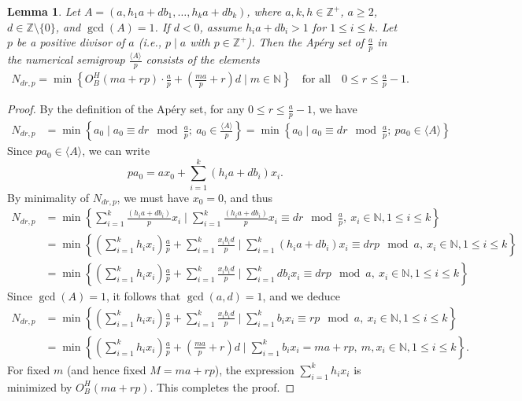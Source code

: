 \documentclass[reqno, 12pt]{article}
\newtheorem{lem}[thm]{Lemma}
\theoremstyle{mydefinition}
\theoremstyle{myremark}
\numberwithin{algorithm}{section}
\begin{document}
\begin{lem}\label{NDR-Quotient}
Let $A=(a, h_1a+db_1, \ldots, h_ka+db_k)$, where $a, k, h\in\mathbb{Z}^{+}$, $a\geq 2$, $d\in \mathbb{Z}\setminus \{0\}$, and $\gcd(A)=1$. If $d<0$, assume $h_ia+db_i>1$ for $1\leq i\leq k$.
Let $p$ be a positive divisor of $a$ (i.e., $p\mid a$ with $p\in \mathbb{Z}^{+}$). Then the Ap\'ery set of $\frac{a}{p}$ in the numerical semigroup $\frac{\langle A\rangle}{p}$ consists of the elements
\begin{align*}
N_{dr,p}=\min \left\{O_{B}^{H}(ma+rp) \cdot \frac{a}{p}+\left(\frac{ma}{p}+r\right)d \mid m\in \mathbb{N}\right\}\quad \text{for all}\quad 0\leq r\leq \frac{a}{p}-1.
\end{align*}
\end{lem}
\begin{proof}
By the definition of the Ap\'ery set, for any $0\leq r\leq \frac{a}{p}-1$, we have
\begin{align*}
N_{dr,p}&=\min\left\{ a_0\mid a_0\equiv dr\mod \frac{a}{p};\ a_0\in \frac{\langle A\rangle}{p}\right\}
=\min\left\{ a_0\mid a_0\equiv dr \mod \frac{a}{p};\ pa_0\in \langle A\rangle\right\}
\end{align*}
Since $p a_0 \in \langle A\rangle$, we can write
$$pa_0=a x_0+\sum_{i=1}^k(h_ia+db_i)x_i.$$
By minimality of $N_{dr,p}$, we must have $x_0 = 0$, and thus
\begin{align*}
N_{dr,p}&=\min\left\{\sum_{i=1}^k\frac{(h_ia+db_i)}{p}x_i\mid \sum_{i=1}^k\frac{(h_ia+db_i)}{p}x_i\equiv dr\mod \frac{a}{p}, \ x_i\in\mathbb{N}, 1\leq i\leq k \right\}
\\&=\min\left\{\left(\sum_{i=1}^k h_ix_i\right)\frac{a}{p}+\sum_{i=1}^k\frac{x_ib_id}{p} \mid \sum_{i=1}^k(h_ia+db_i)x_i\equiv drp \mod a, \ x_i\in\mathbb{N}, 1\leq i\leq k\right\}
\\&=\min\left\{\left(\sum_{i=1}^k h_ix_i\right)\frac{a}{p}+\sum_{i=1}^k\frac{x_ib_id}{p} \mid \sum_{i=1}^kdb_ix_i\equiv drp \mod a, \ x_i\in\mathbb{N}, 1\leq i\leq k\right\}
\end{align*}
Since $\gcd(A) = 1$, it follows that $\gcd(a, d) = 1$, and we deduce
\begin{align*}
N_{dr,p}&=\min\left\{\left(\sum_{i=1}^k h_ix_i\right)\frac{a}{p}+\sum_{i=1}^k\frac{x_ib_id}{p} \mid \sum_{i=1}^kb_ix_i\equiv rp \mod a, \ x_i\in\mathbb{N}, 1\leq i\leq k\right\}
\\&=\min\left\{\left(\sum_{i=1}^k h_ix_i\right)\frac{a}{p}+\left(\frac{ma}{p}+r\right)d \mid \sum_{i=1}^kb_ix_i=ma+rp, \ m,x_i\in\mathbb{N}, 1\leq i\leq k\right\}.
\end{align*}
For fixed $m$ (and hence fixed $M=ma+rp$), the expression $\sum_{i=1}^k h_i x_i$ is minimized by $O_B^{H}(ma +rp)$. This completes the proof.
\end{proof}
\end{document}
